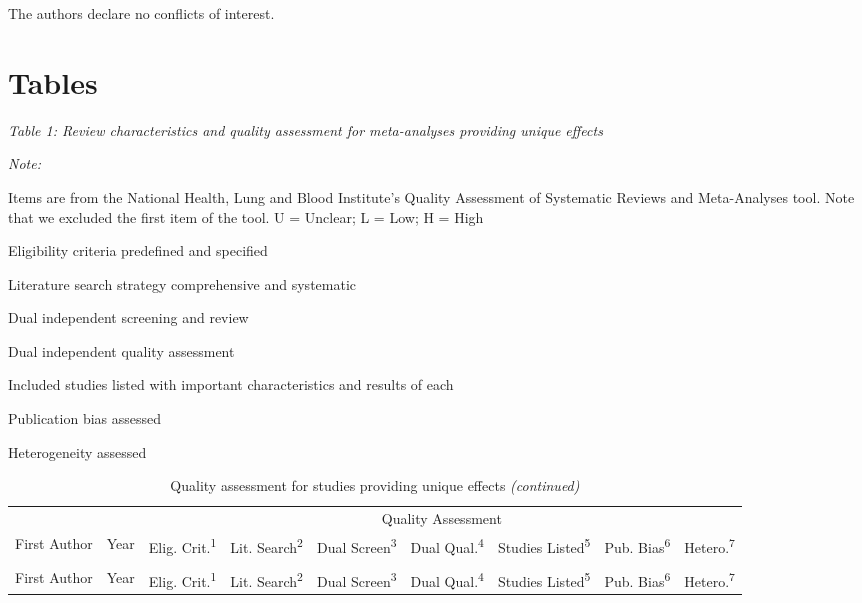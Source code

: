 \documentclass[
  english,
  man]{apa6}
\begin{document}
The authors declare no conflicts of interest.

\hypertarget{tables}{%
\section{Tables}\label{tables}}

\emph{Table 1: Review characteristics and quality assessment for meta-analyses providing unique effects}

\begin{ThreePartTable}
\begin{TableNotes}
\item \textit{Note: } 
\item Items are from the National Health, Lung and Blood Institute's Quality Assessment of Systematic Reviews and Meta-Analyses tool. Note that we excluded the first item of the tool. U = Unclear; L = Low; H = High
\item[1] Eligibility criteria predefined and specified
\item[2] Literature search strategy comprehensive and systematic
\item[3] Dual independent screening and review
\item[4] Dual independent quality assessment
\item[5] Included studies listed with important characteristics and results of each
\item[6] Publication bias assessed
\item[7] Heterogeneity assessed
\end{TableNotes}
\begin{longtable}[t]{ll>{\centering\arraybackslash}p{1.25cm}>{\centering\arraybackslash}p{1.25cm}>{\centering\arraybackslash}p{1.25cm}>{\centering\arraybackslash}p{1.25cm}>{\centering\arraybackslash}p{1.25cm}>{\centering\arraybackslash}p{1.25cm}>{\centering\arraybackslash}p{1.25cm}}
\caption{Quality assessment for studies providing unique effects}\\
\toprule
\multicolumn{2}{c}{ } & \multicolumn{7}{c}{Quality Assessment} \\
\cmidrule(l{3pt}r{3pt}){3-9}
First Author & Year & Elig. Crit.\textsuperscript{1} & Lit. Search\textsuperscript{2} & Dual Screen\textsuperscript{3} & Dual Qual.\textsuperscript{4} & Studies Listed\textsuperscript{5} & Pub. Bias\textsuperscript{6} & Hetero.\textsuperscript{7}\\
\midrule
\endfirsthead
\caption[]{Quality assessment for studies providing unique effects \textit{(continued)}}\\
\toprule
First Author & Year & Elig. Crit.\textsuperscript{1} & Lit. Search\textsuperscript{2} & Dual Screen\textsuperscript{3} & Dual Qual.\textsuperscript{4} & Studies Listed\textsuperscript{5} & Pub. Bias\textsuperscript{6} & Hetero.\textsuperscript{7}\\
\midrule
\endhead


\end{longtable}
\end{ThreePartTable}
\end{document}
